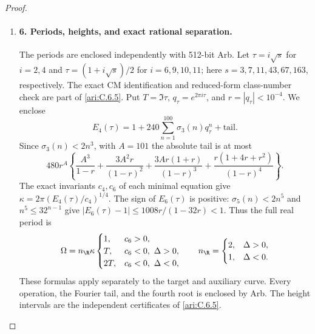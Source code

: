 \begin{proof}
\begin{enumerate}[label=\arabic*.,leftmargin=*]
\item \paragraph{6. Periods, heights, and exact rational separation.}
The periods are enclosed independently with 512-bit Arb. Let
$\tau=i\sqrt s$ for $i=2,4$ and
$\tau=(1+i\sqrt s)/2$ for $i=6,9,10,11$; here
$s=3,7,11,43,67,163$, respectively. The exact CM identification
and reduced-form class-number check are part of \ref{ari:C.6.5}. Put
$T=\Im\tau$, $q_\tau=e^{2\pi i\tau}$, and
$r=|q_\tau|<10^{-4}$. We enclose
\[
 E_4(\tau)=1+240\sum_{n=1}^{100}\sigma_3(n)q_\tau^n
                   +\text{tail}.
\]
Since $\sigma_3(n)<2n^3$, with $A=101$ the absolute tail is at most
\[
 480r^A\left\{
 \frac{A^3}{1-r}+\frac{3A^2r}{(1-r)^2}
 +\frac{3Ar(1+r)}{(1-r)^3}
 +\frac{r(1+4r+r^2)}{(1-r)^4}\right\}.
\]
The exact invariants $c_4,c_6$ of each minimal equation give
$\kappa=2\pi(E_4(\tau)/c_4)^{1/4}$. The sign of $E_6(\tau)$
is positive: $\sigma_5(n)<2n^5$ and
$n^5\leq32^{n-1}$ give
$|E_6(\tau)-1|\leq1008r/(1-32r)<1$.
Thus the full real period is
\[
 \Omega=n_{\R}\kappa\begin{cases}
 1,&c_6>0,\\
 T,&c_6<0,\ \Delta>0,\\
 2T,&c_6<0,\ \Delta<0,
 \end{cases}
 \qquad n_{\R}=\begin{cases}2,&\Delta>0,\\1,&\Delta<0.\end{cases}
\]
These formulas apply separately to the target and auxiliary curve.
Every operation, the Fourier tail, and the fourth root is enclosed
by Arb. The height intervals are the independent certificates
 of \ref{ari:C.6.5}.


\end{enumerate}
\end{proof}
